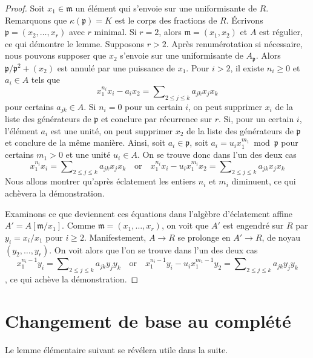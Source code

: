 \begin{proof} Soit $x_1 \in \mathfrak m$ un élément qui s'envoie sur une uniformisante de $R$. Remarquons que $\kappa(\mathfrak p) = K$ est le corps des fractions de $R$. Écrivons $\mathfrak p = (x_2, \ldots, x_r)$ avec $r$ minimal. Si $r = 2$, alors $\mathfrak m = (x_1, x_2)$ et $A$ est régulier, ce qui démontre le lemme. Supposons $r > 2$. Après renumérotation si nécessaire, nous pouvons supposer que $x_2$ s'envoie sur une uniformisante de $A_\mathfrak p$. Alors $\mathfrak p/\mathfrak p^2 + (x_2)$ est annulé par une puissance de $x_1$. Pour $i > 2$, il existe $n_i \geq 0$ et $a_i \in A$ tels que $$
x_1^{n_i} x_i - a_i x_2 = \sum\nolimits_{2 \leq j \leq k} a_{jk} x_jx_k
$$ pour certains $a_{jk} \in A$. Si $n_i = 0$ pour un certain $i$, on peut supprimer $x_i$ de la liste des générateurs de $\mathfrak p$ et conclure par récurrence sur $r$. Si, pour un certain $i$, l'élément $a_i$ est une unité, on peut supprimer $x_2$ de la liste des générateurs de $\mathfrak p$ et conclure de la même manière. Ainsi, soit $a_i \in \mathfrak p$, soit $a_i = u_i x_1^{m_1} \bmod \mathfrak p$ pour certains $m_1 > 0$ et une unité $u_i \in A$. On se trouve donc dans l'un des deux cas $$
x_1^{n_i} x_i = \sum\nolimits_{2 \leq j \leq k} a_{jk} x_jx_k
\quad\text{or}\quad
x_1^{n_i} x_i - u_i x_1^{m_i} x_2 =
\sum\nolimits_{2 \leq j \leq k} a_{jk} x_jx_k
$$ Nous allons montrer qu'après éclatement les entiers $n_i$ et $m_i$ diminuent, ce qui achèvera la démonstration.

\medskip\noindent Examinons ce que deviennent ces équations dans l'algèbre d'éclatement affine $A' = A[\mathfrak m/x_1]$. Comme $\mathfrak m = (x_1, \ldots, x_r)$, on voit que $A'$ est engendré sur $R$ par $y_i = x_i/x_1$ pour $i \geq 2$. Manifestement, $A \to R$ se prolonge en $A' \to R$, de noyau $(y_2, \ldots, y_r)$. On voit alors que l'on se trouve dans l'un des deux cas $$
x_1^{n_i - 1} y_i = \sum\nolimits_{2 \leq j \leq k} a_{jk} y_jy_k
\quad\text{or}\quad
x_1^{n_i - 1} y_i - u_i x_1^{m_1 - 1} y_2 =
\sum\nolimits_{2 \leq j \leq k} a_{jk} y_jy_k
$$, ce qui achève la démonstration. \end{proof}




\section{Changement de base au complété} \label{section-aux}

\noindent Le lemme élémentaire suivant se révélera utile dans la suite.

